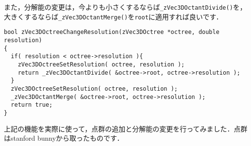 ﻿\documentclass[a4paper]{jsarticle}
\begin{document}
また，分解能の変更は，今よりも小さくするならば\verb|_zVec3DOctantDivide()|を，大きくするならば\verb|_zVec3DOctantMerge()|を\verb|root|に適用すれば良いです．
\begin{screen}
\begin{verbatim}
bool zVec3DOctreeChangeResolution(zVec3DOctree *octree, double resolution)
{
  if( resolution < octree->resolution ){
    zVec3DOctreeSetResolution( octree, resolution );
    return _zVec3DOctantDivide( &octree->root, octree->resolution );
  }
  zVec3DOctreeSetResolution( octree, resolution );
  _zVec3DOctantMerge( &octree->root, octree->resolution );
  return true;
}
\end{verbatim}
\end{screen}

上記の機能を実際に使って，点群の追加と分解能の変更を行ってみました．点群はstanford bunnyから取ったものです．
\end{document}
